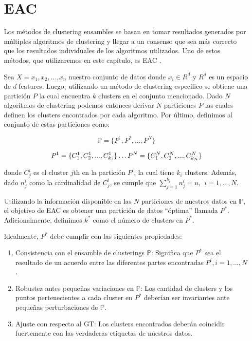 \chapter{\acrlong{EAC}}
\label{chapter:eac}

Los métodos de clustering ensambles se basan en tomar resultados generados por múltiples algoritmos de clustering y llegar a un consenso que sea más correcto que los resultados individuales de los algoritmos utilizados. Uno de estos métodos, que utilizaremos en este capítulo, es \gls{EAC} \citep{fred2005combining}.

Sea $X = {x_1, x_2,...,x_n}$ nuestro conjunto de datos donde $x_i \in R^d$ y $R^d$ es un espacio de $d$ features. Luego, utilizando un método de clustering especifico se obtiene una partición $P$ la cual encuentra $k$ clusters en el conjunto mencionado. Dado $N$ algoritmos de clustering podemos entonces derivar $N$ particiones $P$ las cuales definen los clusters encontrados por cada algoritmo. Por último, definimos al conjunto de estas particiones como:

\begin{equation}
\mathbb{P} = \{P^1, P^2,...,P^N\}
\end{equation}

\begin{multline}
\hfill
    \begin{split}
    P^1 = \{C^1_1, C^1_2,...,C^1_{k_1}\}
    \end{split} \hfill \break
\hdots \hfill \break
    \begin{split}
    P^N = \{C^N_1, C^N_2,...,C^N_{k_N}\}
    \end{split}
\hfill
\end{multline}

\noindent donde $C^i_j$ es el cluster $j$th en la partición $P^i$, la cual tiene $k_i$ clusters. Además, dado $n^i_j$ como la cardinalidad de $C^i_j$, se cumple que $\sum_{j=1}^{k_i} n^i_j=n, \ \ i=1,...,N$.

Utilizando la información disponible en las $N$ particiones de nuestros datos en $\mathbb{P}$, el objetivo de \gls{EAC} es obtener una partición de datos ``óptima'' llamada $P^*$. Adicionalmente, definimos $k^*$ como el número de clusters en $P^*$.

Idealmente, $P^*$ debe cumplir con las siguientes propiedades:
\begin{enumerate}
    \item Consistencia con el ensamble de clusterings $\mathbb{P}$: Significa que $P^*$ sea el resultado de un acuerdo entre las diferentes partes encontradas $P^i, i=1,...,N$.
    \item Robustez antes pequeñas variaciones en $\mathbb{P}$: Los cantidad de clusters y los puntos pertenecientes a cada cluster en $P^*$ deberían ser invariantes ante pequeñas perturbaciones de $\mathbb{P}$.
    \item Ajuste con respecto al \gls{GT}: Los clusters encontrados deberán coincidir fuertemente con las verdaderas etiquetas de nuestros datos.
\end{enumerate}


